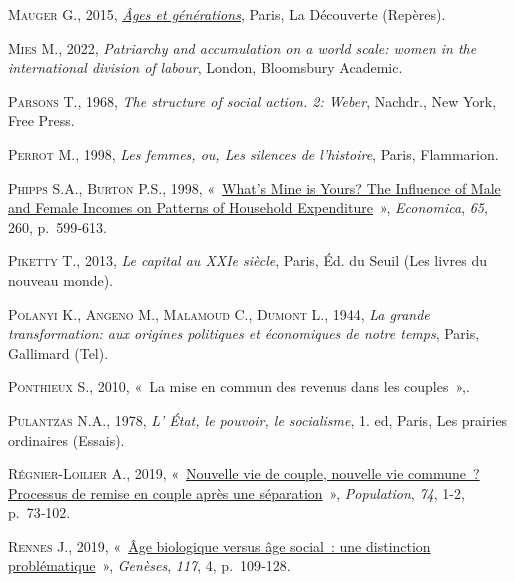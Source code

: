\documentclass[
  12pt,
]{book}
\newlength{\cslhangindent}
\newenvironment{CSLReferences}[2] %
 {\begin{list}{}{%
  \setlength{\itemindent}{0pt}
  \setlength{\leftmargin}{0pt}
  \setlength{\parsep}{0pt}
  \ifodd #1
   \setlength{\leftmargin}{\cslhangindent}
   \setlength{\itemindent}{-1\cslhangindent}
  \fi
  \setlength{\itemsep}{#2\baselineskip}}}
 {\end{list}}
\begin{document}
\begin{CSLReferences}{0}{1}
\textsc{Mauger G.}, 2015,
\emph{\href{https://www.cairn.info/ages-et-generations--9782707158888.htm}{Âges
et générations}}, Paris, La Découverte (Repères).

\textsc{Mies M.}, 2022, \emph{Patriarchy and accumulation on a world
scale: women in the international division of labour}, London,
Bloomsbury Academic.

\textsc{Parsons T.}, 1968, \emph{The structure of social action. 2:
Weber}, Nachdr., New York, Free Press.

\textsc{Perrot M.}, 1998, \emph{Les femmes, ou, Les silences de
l'histoire}, Paris, Flammarion.

\textsc{Phipps S.A.}, \textsc{Burton P.S.}, 1998,
{«~\href{https://doi.org/10.1111/1468-0335.00148}{What{'}s Mine is
Yours? The Influence of Male and Female Incomes on Patterns of Household
Expenditure}~»}, \emph{Economica}, \emph{65}, 260, p.~599‑613.

\textsc{Piketty T.}, 2013, \emph{Le capital au XXIe siècle}, Paris, Éd.
du Seuil (Les livres du nouveau monde).

\textsc{Polanyi K.}, \textsc{Angeno M.}, \textsc{Malamoud C.},
\textsc{Dumont L.}, 1944, \emph{La grande transformation: aux origines
politiques et économiques de notre temps}, Paris, Gallimard (Tel).

\textsc{Ponthieux S.}, 2010, {«~La mise en commun des revenus dans les
couples~»},.

\textsc{Pulantzas N.A.}, 1978, \emph{L' État, le pouvoir, le
socialisme}, 1. ed, Paris, Les prairies ordinaires (Essais).

\textsc{Régnier-Loilier A.}, 2019,
{«~\href{https://doi.org/10.3917/popu.1901.0073}{Nouvelle vie de couple,
nouvelle vie commune~? Processus de remise en couple après une
séparation}~»}, \emph{Population}, \emph{74}, 1-2, p.~73‑102.

\textsc{Rennes J.}, 2019,
{«~\href{https://doi.org/10.3917/gen.117.0109}{Âge biologique versus âge
social~: une distinction problématique}~»}, \emph{Genèses}, \emph{117},
4, p.~109‑128.


\end{CSLReferences}
\end{document}
